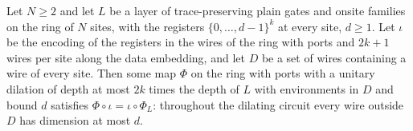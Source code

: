 \begin{lemma}
    \label{lem:protocols_port_routing}
    \leanok
    Let $N\ge2$ and let $L$ be a layer of trace-preserving plain gates and onsite families on
    the ring of $N$ sites, with the registers $\{0,\dots,d-1\}^k$ at every site, $d\ge1$. Let
    $\iota$ be the encoding of the registers in the wires of the ring with ports and $2k+1$
    wires per site along the data embedding, and let $D$ be a set of wires containing a wire of
    every site. Then some map $\Phi$ on the ring with ports with a unitary dilation of depth at
    most $2k$ times the depth of $L$ with environments in $D$ and bound $d$ satisfies
    $\Phi\circ\iota=\iota\circ\Phi_L$: throughout the dilating circuit every wire outside $D$
    has dimension at most $d$.
\end{lemma}
